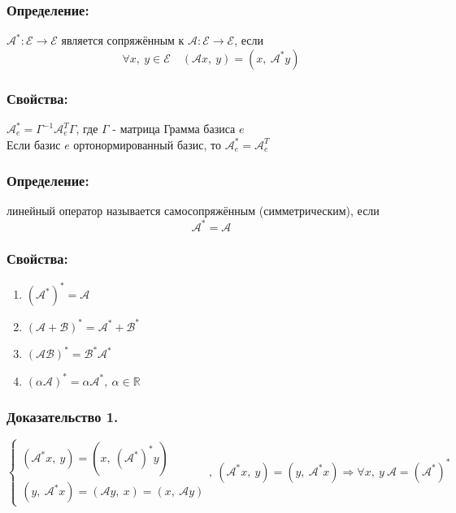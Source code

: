 \documentclass[12pt, letterpaper, twoside]{article}
\begin{document}
\subsubsection*{Определение:}
$\mathcal{A}^*: \mathcal{E} \longrightarrow \mathcal{E}$ является сопряжённым к $\mathcal{A}: \mathcal{E} \longrightarrow \mathcal{E}$, если
\[\forall x,\ y\in \mathcal{E}\quad (\mathcal{A} x,\ y) = (x,\ \mathcal{A}^* y)\]
\subsubsection*{Свойства:}
$\mathcal{A}^*_e = \Gamma^{-1} \mathcal{A}_e^T \Gamma$, где $\Gamma$ - матрица Грамма базиса $e$\\
Если базис $e$ ортонормированный базис, то $\mathcal{A}^*_e = \mathcal{A}^T_e$
\subsubsection*{Определение:}
линейный оператор называется самосопряжённым (симметрическим), если 
\[\mathcal{A}^* = \mathcal{A}\]

\subsubsection*{Свойства:}
\begin{enumerate}
    \item $(\mathcal{A}^*)^* = \mathcal{A}$
    \item $(\mathcal{A} + \mathcal{B})^* = \mathcal{A}^* + \mathcal{B}^*$
    \item $(\mathcal{A} \mathcal{B})^* = \mathcal{B}^* \mathcal{A}^*$
    \item $(\alpha \mathcal{A})^* = \alpha \mathcal{A}^*,\ \alpha\in \mathbb{R}$
\end{enumerate}
\subsubsection*{Доказательство 1.}
\[
\begin{cases}
    (\mathcal{A}^* x,\ y) = \left(x,\ (\mathcal{A}^*)^* y\right)\\
    (y,\ \mathcal{A}^* x) = (\mathcal{A} y,\ x) = (x,\ \mathcal{A} y)
\end{cases},\ (\mathcal{A}^* x,\ y) = (y,\ \mathcal{A}^* x)\Rightarrow \forall x,\ y\ \mathcal{A} = (\mathcal{A}^*)^*
\]
\end{document}
